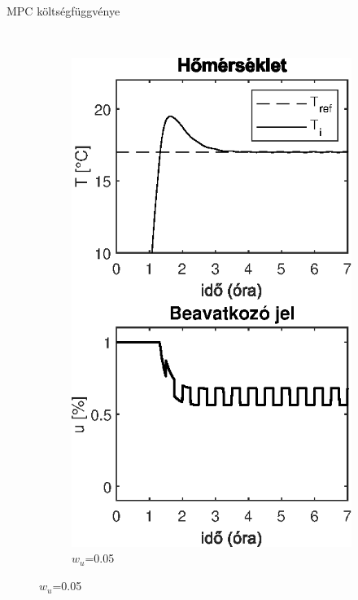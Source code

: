 \documentclass[14pt,handout]{beamer}
\begin{document}
\begin{frame}{MPC költségfüggvénye}
\begin{figure}
	~
	\begin{subfigure}[t]{0.35\textwidth}
		\centering
		\includegraphics[width=\textwidth]{picture/mpc-wu-005.eps}	
		\caption{$w_{u}$=0.05}	
	\end{subfigure}
\end{figure}

\end{frame}
\end{document}
